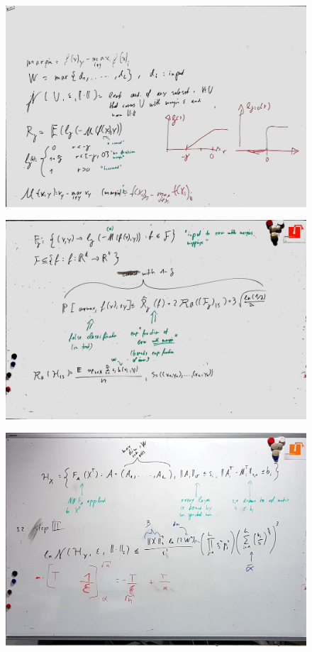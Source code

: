 \begin{figure}[htb]
	\centering
	\includegraphics[width=\textwidth]{whiteboard_notes/18.jpg}
\end{figure}

\begin{figure}[htb]
	\centering
	\includegraphics[width=\textwidth]{whiteboard_notes/19.jpg}
\end{figure}

\begin{figure}[htb]
	\centering
	\includegraphics[width=\textwidth]{whiteboard_notes/20.jpg}
\end{figure}

